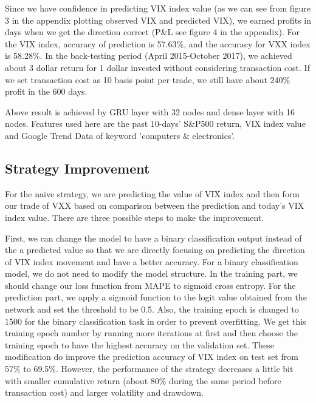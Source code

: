 \documentclass[11pt]{article}
\begin{document}
\vspace{5mm}

Since we have confidence in predicting VIX index value (as we can see from figure 3 in the appendix plotting observed VIX and predicted VIX), we earned profits in days when we get the direction correct (P\&L see figure 4 in the appendix). For the VIX index, accuracy of prediction is 57.63\%, and the accuracy for VXX index is 58.28\%. In the back-testing period (April 2015-October 2017), we achieved about 3 dollar return for 1 dollar invested without considering transaction cost. If we set transaction cost as 10 basis point per trade, we still have about 240\% profit in the 600 days.

\vspace{5mm}

Above result is achieved by GRU layer with 32 nodes and dense layer with 16 nodes. Features used here are the past 10-days' S\&P500 return, VIX index value and Google Trend Data of keyword 'computers \& electronics'.

\subsection{Strategy Improvement}

For the naive strategy, we are predicting the value of VIX index and then form our trade of VXX based on comparison between the prediction and today's VIX index value. There are three possible steps to make the improvement.

\vspace{5mm}

First, we can change the model to have a binary classification output instead of the a predicted value so that we are directly focusing on predicting the direction of VIX index movement and have a better accuracy. For a binary classification model, we do not need to modify the model structure. In the training part, we should change our loss function from MAPE to sigmoid cross entropy. For the prediction part, we apply a sigmoid function to the logit value obtained from the network and set the threshold to be 0.5. Also, the training epoch is changed to 1500 for the binary classification task in order to prevent overfitting. We get this training epoch number by running more iterations at first and then choose the training epoch to have the highest accuracy on the validation set. These modification do improve the prediction accuracy of VIX index on test set from 57\% to 69.5\%. However, the performance of the strategy decreases a little bit with smaller cumulative return (about 80\% during the same period before transaction cost) and larger volatility and drawdown. 
\end{document}
